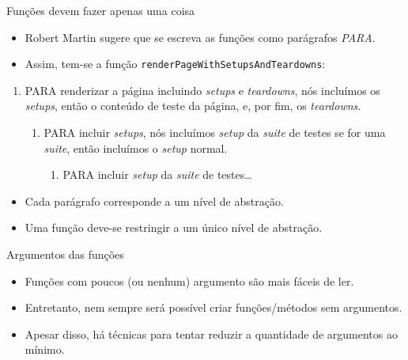 \documentclass[11pt]{beamer}
\begin{document}
  \begin{frame}[fragile]{Funções devem fazer apenas uma coisa}
    \begin{itemize}
      \item Robert Martin sugere que se escreva as funções como parágrafos \textit{PARA}.
      \item Assim, tem-se a função \verb|renderPageWithSetupsAndTeardowns|:
    \end{itemize}
    \begin{enumerate}
      \item PARA renderizar a página incluindo \textit{setups} e \textit{teardowns}, nós incluímos os \textit{setups}, então o conteúdo de teste da página, e, por fim, os \textit{teardowns}.
      \begin{enumerate}[I]
        \item PARA incluir \textit{setups}, nós incluímos \textit{setup} da \textit{suite} de testes se for uma \textit{suite}, então incluímos o \textit{setup} normal.
        \begin{enumerate}[i] 
          \item PARA incluir \textit{setup} da \textit{suite} de testes\dots 
        \end{enumerate}
      \end{enumerate}
    \end{enumerate}
    \begin{itemize}
      \item Cada parágrafo corresponde a um nível de abstração.
      \item Uma função deve-se restringir a um único nível de abstração.
    \end{itemize}
  \end{frame}

  \begin{frame}{Argumentos das funções}
    \begin{itemize}
      \item Funções com poucos (ou nenhum) argumento são mais fáceis de ler.
      \item Entretanto, nem sempre será possível criar funções/métodos sem argumentos.
      \item Apesar disso, há técnicas para tentar reduzir a quantidade de argumentos ao mínimo.
    \end{itemize}
  \end{frame}
 
\end{document}

